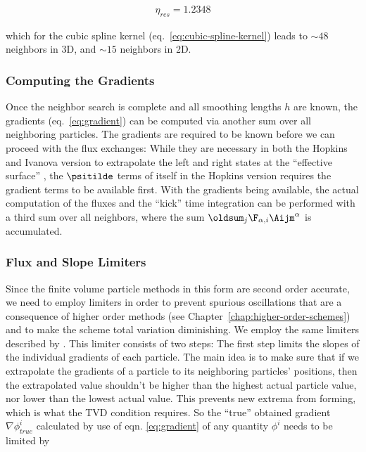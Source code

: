 \begin{align}
    \eta_{res} = 1.2348
\end{align}

which for the cubic spline kernel (eq.~\ref{eq:cubic-spline-kernel}) leads to $\sim 48$ neighbors
in 3D, and $\sim 15$ neighbors in 2D.






\subsubsection{Computing the Gradients}

Once the neighbor search is complete and all smoothing lengths $h$ are known, the gradients
(eq.~\ref{eq:gradient}) can be computed via another sum over all neighboring particles. The
gradients are required to be known before we can proceed with the flux exchanges: While they are
necessary in both the Hopkins and Ivanova version to extrapolate the left and right states at the
``effective surface'' \Aij, the $\psitilde$ terms of \Aij itself in the Hopkins version requires
the gradient terms to be available first. With the gradients being available, the actual
computation of the fluxes and the ``kick'' time integration can be performed with a third sum over
all neighbors, where the sum $\oldsum_j \F_{\alpha, i} \Aijm^\alpha$ is accumulated.




\subsubsection{Flux and Slope Limiters}

Since the finite volume particle methods in this form are second order accurate, we need to employ
limiters in order to prevent spurious oscillations that are a consequence of higher order methods
(see Chapter~\ref{chap:higher-order-schemes}) and to make the scheme total variation diminishing. We
employ the same limiters described by \cite{hopkinsGIZMONewClass2015}. This limiter consists of two
steps: The first step limits the slopes of the individual gradients of each particle. The main idea
is to make sure that if we extrapolate the gradients of a particle to its neighboring particles'
positions, then the extrapolated value shouldn't be higher than the highest actual particle value,
nor lower than the lowest actual value. This prevents new extrema from forming, which is what the
TVD condition requires. So the ``true'' obtained gradient $\nabla \phi^i_{true}$ calculated by use
of eqn. \ref{eq:gradient} of any quantity $\phi^i$ needs to be limited by

